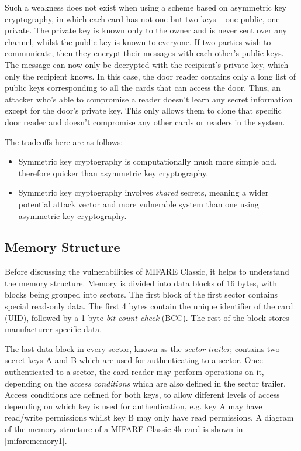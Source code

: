 \documentclass[12pt,a4paper,twoside,openright]{report}
\begin{document}
Such a weakness does not exist when using a scheme based on asymmetric key cryptography, in which each card has not one but two keys -- one public, one private. The private key is known only to the owner and is never sent over any channel, whilst the public key is known to everyone. If two parties wish to communicate, then they encrypt their messages with each other's public keys. The message can now only be decrypted with the recipient's private key, which only the recipient knows. In this case, the door reader contains only a long list of public keys corresponding to all the cards that can access the door. Thus, an attacker who's able to compromise a reader doesn't learn any secret information except for the door's private key. This only allows them to clone that specific door reader and doesn't compromise any other cards or readers in the system.

The tradeoffs here are as follows:

\begin{itemize}
\item Symmetric key cryptography is computationally much more simple and, therefore quicker than asymmetric key cryptography.
\item Symmetric key cryptography involves \emph{shared} secrets, meaning a wider potential attack vector and more vulnerable system than one using asymmetric key cryptography.
\end{itemize}

\subsection{Memory Structure}

Before discussing the vulnerabilities of MIFARE Classic, it helps to understand the memory structure. Memory is divided into data blocks of 16 bytes, with blocks being grouped into sectors. The first block of the first sector contains special read-only data. The first 4 bytes contain the unique identifier of the card (UID), followed by a 1-byte \emph{bit count check} (BCC). The rest of the block stores manufacturer-specific data.

The last data block in every sector, known as the \emph{sector trailer}, contains two secret keys A and B which are used for authenticating to a sector. Once authenticated to a sector, the card reader may perform operations on it, depending on the \emph{access conditions} which are also defined in the sector trailer. Access conditions are defined for both keys, to allow different levels of access depending on which key is used for authentication, e.g. key A may have read/write permissions whilst key B may only have read permissions. A diagram of the memory structure of a MIFARE Classic 4k card is shown in \autoref{mifarememory1}.
\end{document}
